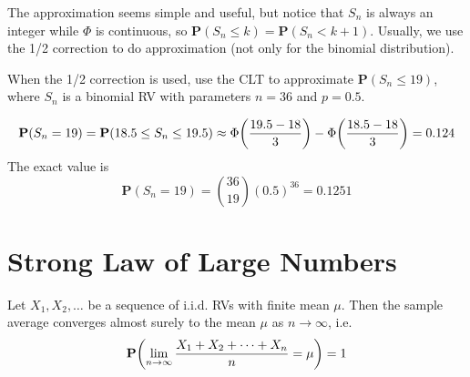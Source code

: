 The approximation seems simple and useful, but notice that $S_n$ is always an integer while $\Phi$ is continuous, so $\mathbf{P}(S_n \leq k) = \mathbf{P}(S_n < k + 1)$. Usually, we use the 1/2 correction to do approximation (not only for the binomial distribution).
\begin{example}
    When the 1/2 correction is used, use the CLT to approximate $\mathbf{P}(S_n \leq 19)$, where $S_n$ is a binomial RV with parameters $n = 36$ and $p = 0.5$.
\end{example}
\begin{solution}
    \begin{equation}
        \mathbf{P}(S_n = 19) = \mathbf{P}(18.5 \leq S_n \leq 19.5) \approx \Phi\qty(\frac{19.5 - 18}{3}) - \Phi\qty(\frac{18.5 - 18}{3}) = 0.124
    \end{equation}
    The exact value is
    \begin{equation}
        \mathbf{P}(S_n = 19) = \binom{36}{19} (0.5)^{36} = 0.1251
    \end{equation}
\end{solution}

\section{Strong Law of Large Numbers}
\begin{theorem}
    Let $X_1, X_2, \ldots$ be a sequence of i.i.d. RVs with finite mean $\mu$. Then the sample average converges almost surely to the mean $\mu$ as $n \to \infty$, i.e.
    \begin{equation}
        \mathbf{P}\qty(\lim_{n \to \infty} \frac{X_1 + X_2 + \cdots + X_n}{n} = \mu) = 1
    \end{equation}
\end{theorem}

